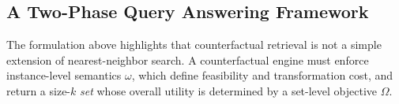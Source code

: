 \subsection{A Two-Phase Query Answering Framework}
The formulation above highlights that counterfactual retrieval is not a simple extension of nearest-neighbor search. A counterfactual engine must enforce instance-level semantics $\omega$, which define feasibility and transformation cost, and return a size-$k$ \emph{set} whose overall utility is determined by a set-level objective $\Omega$.








